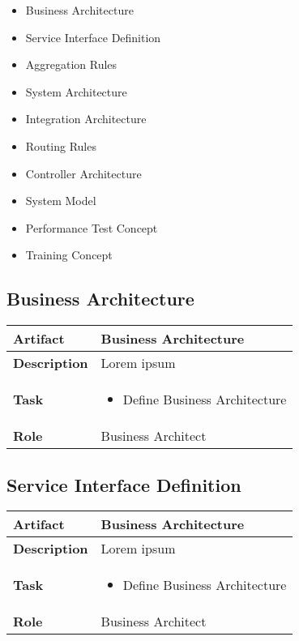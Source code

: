 \begin{itemize}
	\item Business Architecture
	\item Service Interface Definition
	\item Aggregation Rules
	\item System Architecture
	\item Integration Architecture
	\item Routing Rules
	\item Controller Architecture
	\item System Model
	\item Performance Test Concept
	\item Training Concept
\end{itemize}

\subsection{Business Architecture}
\begin{minipage}{\textwidth}
 \label{table:ch6_Artifact_Business_Architecture}
\begin{tabular}
	{|m{2cm}|m{10cm}|} \hline \bfseries Artifact & Business Architecture\\
	\hline \bfseries Description & Lorem ipsum\\
	\hline \bfseries Task & 
	\begin{itemize}
		\item Define Business Architecture 
	\end{itemize}
	\\
	\hline \bfseries Role & Business Architect\\
	\hline 
\end{tabular}
\end{minipage}

\subsection{Service Interface Definition}
\begin{minipage}{\textwidth}
 \label{table:ch6_Artifact_Service_Interface_Definition}
\begin{tabular}
	{|m{2cm}|m{10cm}|} \hline \bfseries Artifact & Business Architecture\\
	\hline \bfseries Description & Lorem ipsum\\
	\hline \bfseries Task & 
	\begin{itemize}
		\item Define Business Architecture 
	\end{itemize}
	\\
	\hline \bfseries Role & Business Architect\\
	\hline 
\end{tabular}
\end{minipage}

